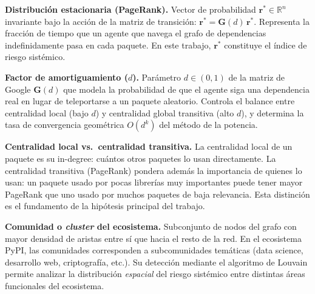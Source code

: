 \textbf{Distribución estacionaria (PageRank).}
Vector de probabilidad $\mathbf{r}^* \in \mathbb{R}^n$ invariante bajo la 
acción de la matriz de transición: $\mathbf{r}^* = \mathbf{G}(d)\,\mathbf{r}^*$. 
Representa la fracción de tiempo que un agente que navega el grafo de 
dependencias indefinidamente pasa en cada paquete. En este trabajo, 
$\mathbf{r}^*$ constituye el índice de riesgo sistémico.

\textbf{Factor de amortiguamiento ($d$).}
Parámetro $d \in (0,1)$ de la matriz de Google $\mathbf{G}(d)$ que modela 
la probabilidad de que el agente siga una dependencia real en lugar de 
teleportarse a un paquete aleatorio. Controla el balance entre centralidad 
local (bajo $d$) y centralidad global transitiva (alto $d$), y determina 
la tasa de convergencia geométrica $O(d^k)$ del método de la potencia.

\textbf{Centralidad local vs.\ centralidad transitiva.}
La centralidad local de un paquete es su in-degree: cuántos otros paquetes 
lo usan directamente. La centralidad transitiva (PageRank) pondera además 
la importancia de quienes lo usan: un paquete usado por pocas librerías 
muy importantes puede tener mayor PageRank que uno usado por muchos paquetes 
de baja relevancia. Esta distinción es el fundamento de la hipótesis 
principal del trabajo.

\textbf{Comunidad o \textit{cluster} del ecosistema.}
Subconjunto de nodos del grafo con mayor densidad de aristas entre sí que 
hacia el resto de la red. En el ecosistema PyPI, las comunidades corresponden 
a subcomunidades temáticas (data science, desarrollo web, criptografía, etc.). 
Su detección mediante el algoritmo de Louvain permite analizar la distribución 
\textit{espacial} del riesgo sistémico entre distintas áreas funcionales del ecosistema.
